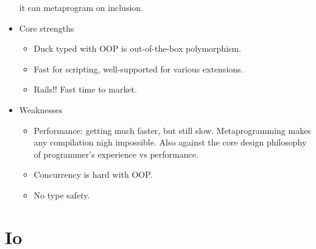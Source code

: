 \documentclass[10pt, twocolumn, landscape]{article}
\begin{document}
\begin{itemize}
        it can metaprogram on inclusion.
    \item Core strengths
        \begin{itemize}
            \item Duck typed with OOP is out-of-the-box polymorphism.
            \item Fast for scripting, well-supported for various extensions.
            \item Rails!! Fast time to market.
        \end{itemize}
    \item Weaknesses
        \begin{itemize}
            \item Performance: getting much faster, but still slow.
                Metaprogramming makes any compilation nigh impossible. Also
                against the core design philosophy of programmer's experience vs
                performance.
            \item Concurrency is hard with OOP.\@
            \item No type safety.
        \end{itemize}
\end{itemize}

\section{Io}
\end{document}
